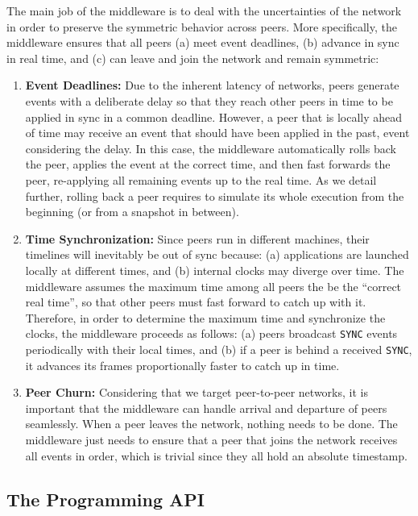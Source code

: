 \documentclass[10pt,journal,compsoc]{IEEEtran}
\newcommand{\code}[1]  {\texttt{\footnotesize{#1}}}
\begin{document}
The main job of the middleware is to deal with the uncertainties of the
network in order to preserve the symmetric behavior across peers.
More specifically, the middleware ensures that all peers
    (a) meet event deadlines,
    (b) advance in sync in real time, and
    (c) can leave and join the network and remain symmetric:
%
\begin{enumerate}
\item \textbf{Event Deadlines:}
Due to the inherent latency of networks, peers generate events with a
deliberate delay so that they reach other peers in time to be applied in sync
in a common deadline.
However, a peer that is locally ahead of time may receive an event that should
have been applied in the past, event considering the delay.
In this case, the middleware automatically rolls back the peer, applies the
event at the correct time, and then fast forwards the peer, re-applying all
remaining events up to the real time.
As we detail further, rolling back a peer requires to simulate its whole
execution from the beginning (or from a snapshot in between).
%
\item \textbf{Time Synchronization:}
Since peers run in different machines, their timelines will inevitably be out
of sync because:
    (a) applications are launched locally at different times, and
    (b) internal clocks may diverge over time.
The middleware assumes the maximum time among all peers the be the
``correct real time'', so that other peers must fast forward to catch up with
it.
Therefore, in order to determine the maximum time and synchronize the clocks,
the middleware proceeds as follows:
    (a) peers broadcast \code{SYNC} events periodically with their local
        times, and
    (b) if a peer is behind a received \code{SYNC}, it advances its frames
        proportionally faster to catch up in time.
%
\item \textbf{Peer Churn:}
Considering that we target peer-to-peer networks, it is important that the
middleware can handle arrival and departure of peers seamlessly.
When a peer leaves the network, nothing needs to be done.
The middleware just needs to ensure that a peer that joins the network receives
all events in order, which is trivial since they all hold an absolute
timestamp.
\end{enumerate}

\subsection{The Programming API}
\label{sec.tml.api}
\end{document}

